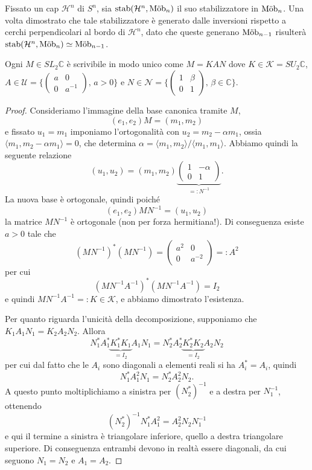 \begin{osservazione}
	Fissato un cap $\mathcal H^{n}$ di $S^{n}$, sia $\operatorname{stab}(\mathcal H^{n},\operatorname{M\ddot ob}_{n})$ il suo stabilizzatore in $\operatorname{M\ddot ob}_{n}$. Una volta dimostrato che tale stabilizzatore è generato dalle inversioni rispetto a cerchi perpendicolari al bordo di $\mathcal H^{n}$, dato che queste generano $\operatorname{M\ddot ob}_{n-1}$ risulterà $\operatorname{stab}(\mathcal H^{n}, \operatorname{M\ddot ob}_{n})\simeq\operatorname{M\ddot ob}_{n-1}$.
\end{osservazione}

\begin{lemma}
	Ogni $M\in SL_{2}\mathbb C$ è scrivibile in modo unico come $M = KAN$ dove $K \in \mathcal K = SU_{2}\mathbb C$, $A \in \mathcal U = \{\begin{pmatrix}a & 0\\ 0 & a^{-1}\end{pmatrix},\,a>0\}$ e $N\in\mathcal N = \{\begin{pmatrix}1 & \beta\\ 0 & 1\end{pmatrix},\,\beta\in\mathbb C\}$.
\end{lemma}
\begin{proof}
	Consideriamo l'immagine della base canonica tramite $M$, 
	$$(e_{1}, e_{2})M = (m_{1}, m_{2})$$
	e fissato $u_{1} = m_{1}$ imponiamo l'ortogonalità con $u_{2} = m_{2}-\alpha m_{1}$, ossia $\langle m_{1}, m_{2}-\alpha m_{1}\rangle = 0$, che determina $\alpha = \langle m_{1}, m_{2}\rangle /\langle m_{1}, m_{1}\rangle$. Abbiamo quindi la seguente relazione
	$$(u_{1}, u_{2}) = (m_{1},m_{2}) \underbrace{\begin{pmatrix}1 & -\alpha\\ 0 & 1\end{pmatrix}}_{=:N^{-1}}.$$
	La nuova base è ortogonale, quindi poiché 
	$$(e_{1}, e_{2}) MN^{-1} = (u_{1},u_{2})$$
	la matrice $MN^{-1}$ è ortogonale (non per forza hermitiana!). Di conseguenza esiste $a>0$ tale che 
	$$(MN^{-1})^{*}(MN^{-1}) = \begin{pmatrix}a^{2} & 0\\ 0 & a^{-2}\end{pmatrix} =: A^{2}$$
	per cui 
	$$(MN^{-1}A^{-1})^{*}(MN^{-1}A^{-1}) = I_{2}$$
	e quindi $MN^{-1}A^{-1} =: K\in\mathcal K$, e abbiamo dimostrato l'esistenza.
	
	Per quanto riguarda l'unicità della decomposizione, supponiamo che $K_{1}A_{1}N_{1} = K_{2}A_{2}N_{2}$. 
	Allora 
	$$N_{1}^{*}A_{1}^{*}\underbrace{K_{1}^{*}K_{1}}_{=I_{2}}A_{1}N_{1} = N_{2}^{*}A_{2}^{*}\underbrace{K_{2}^{*}K_{2}}_{=I_{2}}A_{2}N_{2}$$
	per cui dal fatto che le $A_{i}$ sono diagonali a elementi reali si ha $A_{i}^{*} = A_{i}$, quindi 
	$$N_{1}^{*}A_{1}^{2}N_{1} = N_{2}^{*}A_{2}^{2}N_{2}.$$
	A questo punto moltiplichiamo a sinistra per $(N_{2}^{*})^{-1}$ e a destra per $N_{1}^{-1}$, ottenendo
	$$(N_{2}^{*})^{-1} N_{1}^{*} A_{1}^{2} = A_{2}^{2} N_{2}N_{1}^{-1}$$
	e qui il termine a sinistra è triangolare inferiore, quello a destra triangolare superiore. Di conseguenza entrambi devono in realtà essere diagonali, da cui seguono $N_{1} = N_{2}$ e $A_{1} = A_{2}$. 
\end{proof}


